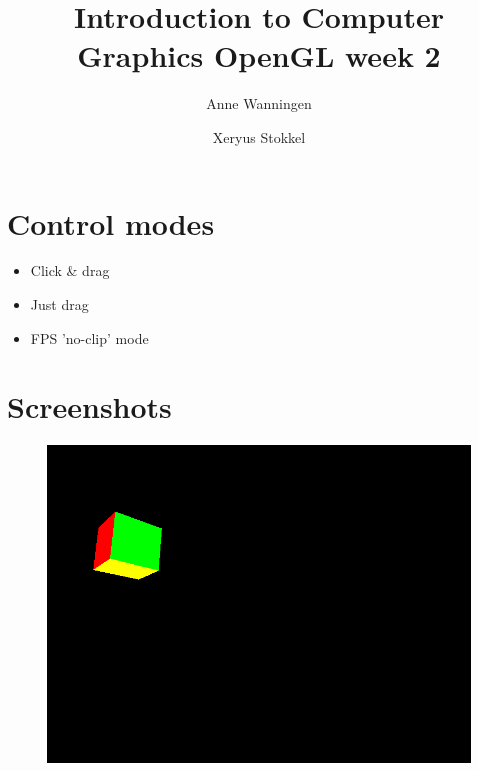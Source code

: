 \documentclass{beamer}
\author{Anne Wanningen \and Xeryus Stokkel}
\title[Week 2]{Introduction to Computer Graphics OpenGL week 2}
\begin{document}
\maketitle

\section{Control modes}
\begin{frame}
	\begin{itemize}
		\item Click \& drag
		\item Just drag
		\item FPS 'no-clip' mode
	\end{itemize}
\end{frame}

\section{Screenshots}
\begin{frame}
	\begin{figure}
		\includegraphics[height=.8\textheight]{oglcubefps.png}
	\end{figure}
\end{frame}
\end{document}

